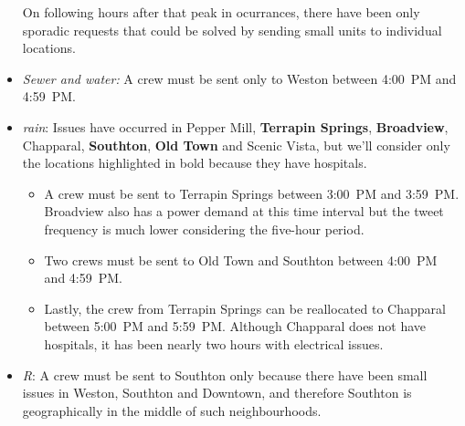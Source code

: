 \begin{itemize}
On following hours after that peak in ocurrances, there have been only sporadic
requests that could be solved by sending small units to individual locations. 
\item \emph{Sewer and water:} A crew must be sent only to Weston between 4:00~PM and 4:59~PM.                                                          
     \smallskip                                                                   
     \item \emph{rain}: Issues have occurred in Pepper Mill, \textbf{Terrapin    
     Springs}, \textbf{Broadview}, Chapparal, \textbf{Southton}, \textbf{Old      
     Town} and Scenic Vista, but we'll consider only the locations                
     highlighted in bold because they have hospitals.                             
     \begin{itemize}                                                              
         \item A crew must be sent to Terrapin Springs between 3:00~PM and        
         3:59~PM. Broadview also has a power demand at this time interval but the 
         tweet frequency is much lower considering the five-hour period.                           \item Two crews must be sent to Old Town and Southton between 4:00~PM    
         and 4:59~PM.                                                             
         \item Lastly, the crew from Terrapin Springs can be reallocated to                Chapparal between 5:00~PM and 5:59~PM. Although Chapparal does not have  
         hospitals, it has been nearly two hours with electrical issues.          
     \end{itemize}                                                                
     \item \emph{R}: A crew must be sent to Southton only   
     because there have been small issues in Weston, Southton and Downtown, and   
     therefore Southton is geographically in the middle of such neighbourhoods.   
 \end{itemize}   

